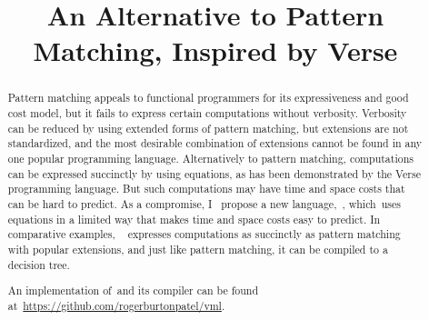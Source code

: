 \documentclass[manuscript,screen 12pt, nonacm]{acmart}
\title{An Alternative to Pattern Matching, Inspired by Verse}
\begin{document}
\begin{abstract}
    Pattern matching %
    appeals %
    to functional programmers for its expressiveness and good cost model, 
    but 
    it %
    fails to express %
    certain computations without verbosity. Verbosity %
    can be reduced %
    by using extended forms of pattern matching,
    but extensions %
    are %
    not standardized, and the most desirable combination of extensions cannot be
    found in any one popular programming language. Alternatively to pattern
    matching, computations can be expressed succinctly by using equations, as
    has been demonstrated by the Verse programming language. But such
    computations may have time and space costs that can be hard to predict. 
    As a compromise, 
    I %
    ~propose %
     a 
    new language,~\VMinus, %
    which~uses equations in a limited way that makes time and space costs easy
    to predict. 
    In
    comparative examples,
    \VMinus~ %
    expresses %
    computations as succinctly as pattern matching with popular extensions, and just like pattern matching, it %
    can be compiled %
    to a decision tree. 
    
    An implementation of~\VMinus and its compiler can be found
    at~\url{https://github.com/rogerburtonpatel/vml}.
\end{abstract}

\maketitle
\end{document}
